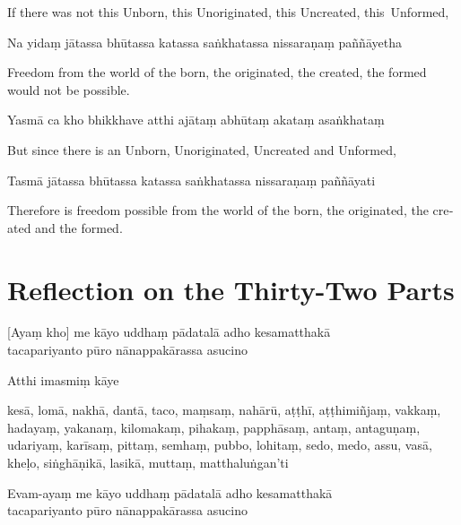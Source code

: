\begin{english}
  If there was not this Unborn, this Unoriginated, this Uncreated, this~Unformed,
\end{english}

Na yidaṃ jātassa bhūtassa katassa saṅkhatassa nissaraṇaṃ paññāyetha

\begin{english}
  Freedom from the world of the born, the originated, the created, the formed would not be possible.
\end{english}

Yasmā ca kho bhikkhave atthi ajātaṃ abhūtaṃ akataṃ asaṅkhataṃ

\begin{english}
  But since there is an Unborn, Unoriginated, Uncreated and Unformed,
\end{english}

Tasmā jātassa bhūtassa katassa saṅkhatassa nissaraṇaṃ paññāyati

\begin{english}
  Therefore is freedom possible from the world of the born, the originated, the created and the formed.
\end{english}


\section{Reflection on the Thirty-Two Parts}

\begin{leader}
\end{leader}


[Ayaṃ kho] me kāyo uddhaṃ pādatalā adho kesamatthakā\\
tacapariyanto pūro nānappakārassa asucino

Atthi imasmiṃ kāye

kesā, lomā, nakhā, dantā, taco, maṃsaṃ, nahārū, aṭṭhī, aṭṭhimiñjaṃ, vakkaṃ, hadayaṃ, yakanaṃ, kilomakaṃ, pihakaṃ, papphāsaṃ, antaṃ, antaguṇaṃ, udariyaṃ, karīsaṃ, pittaṃ, semhaṃ, pubbo, lohitaṃ, sedo, medo, assu, vasā, kheḷo, siṅghāṇikā, lasikā, muttaṃ, matthaluṅgan'ti

Evam-ayaṃ me kāyo uddhaṃ pādatalā adho kesamatthakā\\
tacapariyanto pūro nānappakārassa asucino\\

